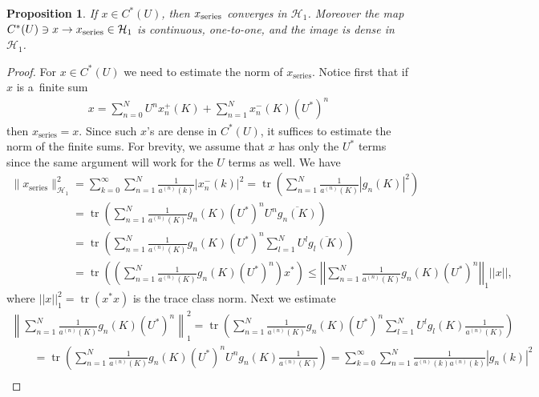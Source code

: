 \documentclass[11pt]{article}
\numberwithin{equation}{section}
\newtheorem{prop}[theo]{Proposition}
{\theoremstyle{definition}
\newtheorem{rem}[theo]{Remark}
\newtheorem{defin}[theo]{Definition}
}
\DeclareMathOperator{\tr}{tr}
\begin{document}
\begin{prop}%
If $x\in C^*(U)$, then $x_{\rm series}$ converges in $\mathcal{H}_1$.
Moreover the map $C^*(U)\ni x\to x_{\rm series}\in \mathcal{H}_1$ is continuous, one-to-one, and the image is dense
in $\mathcal{H}_1$.
\end{prop}

\begin{proof}
For $x\in C^*(U)$ we need to estimate the norm of $x_\textrm{series}$.
Notice f\/irst that if $x$ is a~f\/inite sum
\begin{gather*}
x = \sum\limits_{n=0}^N U^n x_n^+(K) + \sum\limits_{n=1}^N x_n^-(K)(U^*)^n
\end{gather*}
then $x_{\textrm{series}} = x$.
Since such $x$'s are dense in $C^*(U)$, it suf\/f\/ices to estimate the norm of the f\/inite sums.
For brevity, we assume that $x$ has only the $U^*$ terms since the same argument will work for the $U$ terms as well.
We have
\begin{gather*}
\|x_{\textrm{series}}\|_{\mathcal{H}_1}^2 = \sum\limits_{k=0}^\infty \sum\limits_{n=1}^N
\frac{1}{a^{(n)}(k)}|x_n^-(k)|^2 = \tr\left(\sum\limits_{n=1}^N \frac{1}{a^{(n)}(K)}|g_n(K)|^2\right)
\\
\phantom{\|x_{\textrm{series}}\|_{\mathcal{H}_1}^2}
= \tr\left(\sum\limits_{n=1}^N \frac{1}{a^{(n)}(K)}g_n(K)\left(U^*\right)^nU^n\overline{g_n(K)}\right)
\\
\phantom{\|x_{\textrm{series}}\|_{\mathcal{H}_1}^2}
=\tr\left(\sum\limits_{n=1}^N \frac{1}{a^{(n)}(K)}g_n(K)\left(U^*\right)^n\sum\limits_{l=1}^NU^l\overline{g_l(K)}\right)
\\
\phantom{\|x_{\textrm{series}}\|_{\mathcal{H}_1}^2}
=\tr\left(\left(\sum\limits_{n=1}^N \frac{1}{a^{(n)}(K)}g_n(K)(U^*)^n\right)x^*\right)\leq
\left|\left|\sum\limits_{n=1}^N \frac{1}{a^{(n)}(K)}g_n(K)(U^*)^n\right|\right|_1||x||,
\end{gather*}
where $||x||^2_1=\tr(x^*x)$ is the trace class norm.
Next we estimate
\begin{gather*}
\left\|\sum\limits_{n=1}^N \frac{1}{a^{(n)}(K)}g_n(K)\left(U^*\right)^n\right\|_1^2 =
\tr\left(\sum\limits_{n=1}^N\frac{1}{a^{(n)}(K)}g_n(K)\left(U^*\right)^n\sum\limits_{l=1}^N
U^lg_l(K)\frac{1}{a^{(n)}(K)}\right)
\\
\qquad
=\tr\left(\sum\limits_{n=1}^N\frac{1}{a^{(n)}(K)}g_n(K)\left(U^*\right)^nU^n g_n(K)\frac{1}{a^{(n)}(K)}\right)
= \sum\limits_{k=0}^\infty \sum\limits_{n=1}^N \frac{1}{a^{(n)}(k)a^{(n)}(k)}|g_n(k)|^2
\\

\end{gather*}
\end{proof}
\end{document}
